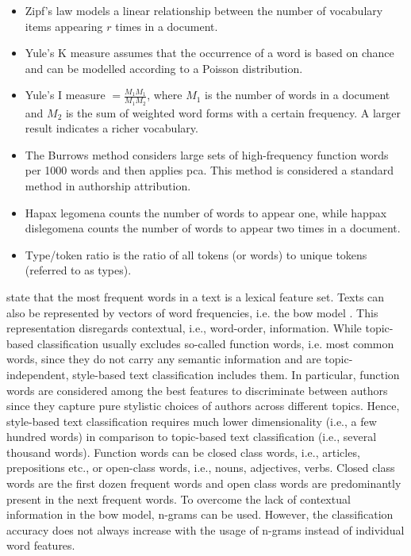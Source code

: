 \begin{itemize}
    \item Zipf's law models a linear relationship between the number of vocabulary items appearing $r$ times in a document.
    \item Yule's K measure assumes that the occurrence of a word is based on chance and can be modelled according to a Poisson distribution.
    \item Yule's I measure $= \frac{M_1 M_1}{M_1 M_2}$, where $M_1$ is the number of words in a document and $M_2$ is the sum of weighted word forms with a certain frequency. A larger result indicates a richer vocabulary.
    \item The Burrows method considers large sets of high-frequency function words per 1000 words and then applies \ac{pca}. This method is considered a standard method in authorship attribution.
    \item Hapax legomena counts the number of words to appear one, while happax dislegomena counts the number of words to appear two times in a document.
    \item Type/token ratio is the ratio of all tokens (or words) to unique tokens (referred to as types).
\end{itemize}
\citet{elmanarelbouanani_authorship_2014} state that the most frequent words in a text is a lexical feature set.
Texts can also be represented by vectors of word frequencies, i.e. the \ac{bow} model \citep{bevendorff_overview_2024}.
This representation disregards contextual, i.e., word-order, information.
While topic-based classification usually excludes so-called function words, 
i.e. most common words, since they do not carry any semantic information and are topic-independent, 
style-based text classification includes them.
In particular, function words are considered among the best features to discriminate between authors 
since they capture pure stylistic choices of authors across different topics.
Hence, style-based text classification requires much lower dimensionality (i.e., a few hundred words) 
in comparison to topic-based text classification (i.e., several thousand words).
Function words can be closed class words, i.e., articles, prepositions etc., 
or open-class words, i.e., nouns, adjectives, verbs.
Closed class words are the first dozen frequent words and 
open class words are predominantly present in the next frequent words.
To overcome the lack of contextual information in the \ac{bow} model, 
n-grams can be used.
However, the classification accuracy does not always increase with the usage of n-grams instead of individual word features.
